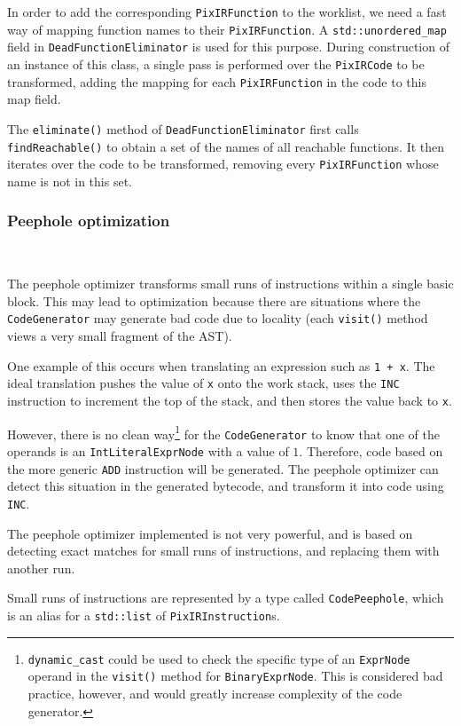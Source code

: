 \documentclass[11pt,a4paper]{scrartcl}
\begin{document}
In order to add the corresponding \verb|PixIRFunction| to the worklist, we need a fast way of mapping function names to their \verb|PixIRFunction|. A \verb|std::unordered_map| field in \verb|DeadFunctionEliminator| is used for this purpose. During construction of an instance of this class, a single pass is performed over the \verb|PixIRCode| to be transformed, adding the mapping for each \verb|PixIRFunction| in the code to this map field.

The \verb|eliminate()| method of \verb|DeadFunctionEliminator| first calls \verb|findReachable()| to obtain a set of the names of all reachable functions. It then iterates over the code to be transformed, removing every \verb|PixIRFunction| whose name is not in this set.

\subsubsection{Peephole optimization}~\label{sec:peephole}

The peephole optimizer transforms small runs of instructions within a single basic block. This may lead to optimization because there are situations where the \verb|CodeGenerator| may generate bad code due to locality (each \verb|visit()| method views a very small fragment of the AST).

One example of this occurs when translating an expression such as \verb|1 + x|. The ideal translation pushes the value of \verb|x| onto the work stack, uses the \verb|INC| instruction to increment the top of the stack, and then stores the value back to \verb|x|.

However, there is no clean way\footnote{\verb|dynamic_cast| could be used to check the specific type of an \verb|ExprNode| operand in the \verb|visit()| method for \verb|BinaryExprNode|. This is considered bad practice, however, and would greatly increase complexity of the code generator.} for the \verb|CodeGenerator| to know that one of the operands is an \verb|IntLiteralExprNode| with a value of $1$. Therefore, code based on the more generic \verb|ADD| instruction will be generated. The peephole optimizer can detect this situation in the generated bytecode, and transform it into code using \verb|INC|.

The peephole optimizer implemented is not very powerful, and is based on detecting exact matches for small runs of instructions, and replacing them with another run.

Small runs of instructions are represented by a type called \verb|CodePeephole|, which is an alias for a \verb|std::list| of \verb|PixIRInstruction|s.
\end{document}
